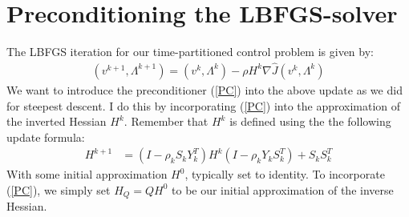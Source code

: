 \documentclass[11pt,a4paper]{article}
\begin{document}
\section{Preconditioning the LBFGS-solver}
The LBFGS iteration for our time-partitioned control problem is given by:
\begin{align}
(v^{k+1},\Lambda^{k+1})= (v^{k},\Lambda^{k}) - \rho H^k\nabla\hat{J}(v^{k},\Lambda^{k}) \label{lbfgs_itr}
\end{align}
We want to introduce the preconditioner (\ref{PC}) into the above update as we did for steepest descent. I do this by incorporating (\ref{PC}) into the approximation of the inverted Hessian $H^k$. Remember that $H^k$ is defined using the the following update formula: 
\begin{align*}
H^{k+1} &= (I-\rho_kS_kY_k^T)H^k(I-\rho_kY_kS_k^T) + S_kS_k^T
\end{align*}
With some initial approximation $H^0$, typically set to identity. To incorporate (\ref{PC}), we simply set $H_Q=QH^0$ to be our initial approximation of the inverse Hessian.
\end{document}
